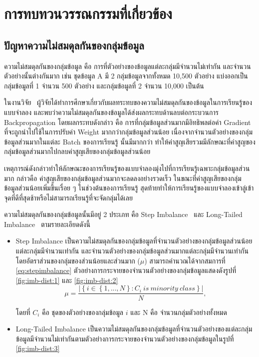 \chapter{การทบทวนวรรณกรรมที่เกี่ยวข้อง}
\label{chapter:literature-review}

\section{ปัญหาความไม่สมดุลกันของกลุ่มข้อมูล}
ความไม่สมดุลกันของกลุ่มข้อมูล คือ การที่ตัวอย่างของข้อมูลแต่ละกลุ่มมีจำนวนไม่เท่ากัน และจำนวนตัวอย่างนั้นต่างกันมาก เช่น ชุดข้อมูล A มี 2 กลุ่มข้อมูลจากทั้งหมด 10,500 ตัวอย่าง 
แบ่งออกเป็นกลุ่มข้อมูลที่ 1 จำนวน 500 ตัวอย่าง และกลุ่มข้อมูลที่ 2 จำนวน 10,000 เป็นต้น 

ในงานวิจัย~\cite{Anand:1993} ผู้วิจัยได้ทำการศึกษาเกี่ยวกับผลทระทบของความไม่สมดุลกันของข้อมูลในการเรียนรู้ของแบบจำลอง และพบว่าความไม่สมดุลกันของข้อมูลได้ส่งผลกระทบด้านลบต่อกระบวนการ Backpropagation โดยผลกระทบดังกล่าว คือ การที่กลุ่มข้อมูลส่วนมากมีอิทธิพลต่อค่า Gradient ที่จะถูกนำไปใช้ในการปรับค่า Weight มากกว่ากลุ่มข้อมูลส่วนน้อย เนื่องจากจำนวนตัวอย่างของกลุ่มข้อมูลส่วนมากในแต่ละ Batch ของการเรียนรู้ นั้นมีมากกว่า ทำให้ค่าสูญเสียรวมมีลักษณะที่ค่าสูญของกลุ่มข้อมูลส่วนมากไปกลบค่าสูญเสียของกลุ่มข้อมูลส่วนน้อย 

เหตุการณ์ดังกล่าวทำให้ลักษณะของการเรียนรู้ของแบบจำลองมุ่งไปที่การเรียนรู้เฉพาะกลุ่มข้อมูลส่วนมาก  กล่าวคือ ค่าสูญเสียของกลุ่มข้อมูลส่วนมากจะลดลงอย่างรวดเร็ว ในขณะที่ค่าสูญเสียของกลุ่มข้อมูลส่วนน้อยเพิ่มขึ้นเรื่อย ๆ ในช่วงต้นของการเรียนรู้ สุดท้ายทำให้การเรียนรู้ของแบบจำลองเข้าลู่เข้าจุดที่ดีที่สุดช้าหรือไม่สามารถเรียนรู้ที่จะจัดกลุ่มได้เลย

ความไม่สมดุลกันของกลุ่มข้อมูลนั้นมีอยู่ 2 ประเภท คือ Step Imbalance~\cite{Buda:2017} และ Long-Tailed Imbalance~\cite{Liu:2019} ตามรายละเอียดดังนี้

\begin{itemize}
  \item Step Imbalance เป็นความไม่สมดุลกันของกลุ่มข้อมูลที่จำนวนตัวอย่างของกลุ่มข้อมูลส่วนน้อยแต่ละกลุ่มมีจำนวนเท่ากัน และจำนวนตัวอย่างของกลุ่มข้อมูลส่วนมากแต่ละกลุ่มมีจำนวนเท่ากัน โดยอัตราส่วนของกลุ่มของส่วนน้อยและส่วนมาก ($\mu$) สามารถคำนวณได้จากสมการที่ \ref{eq:stepimbalance} ตัวอย่างการกระจายของจำนวนตัวอย่างของกลุ่มข้อมูลแสดงดังรูปที่ \ref{fig:imb-dist:1} และ \ref{fig:imb-dist:2} 
  \begin{equation}
      \mu = \frac{\left | \left \{ i\in  \left \{ 1,...,N \right \}: C_{i}\:is\:minority\:class \right \} \right |}{N},
      \label{eq:stepimbalance}
    \end{equation}

    โดยที่ $C_{i}$ คือ ชุดของตัวอย่างของกลุ่มข้อมูล $i$ และ N คือ จำนวนกลุ่มตัวอย่างทั้งหมด
  \item Long-Tailed Imbalance เป็นความไม่สมดุลกันของกลุ่มข้อมูลที่จำนวนตัวอย่างของแต่ละกลุ่มข้อมูลมีจำนวนไม่เท่ากันตามตัวอย่างการกระจายของจำนวนตัวอย่างของกลุ่มข้อมูลในรูปที่ \ref{fig:imb-dist:3}
  
\end{itemize}

